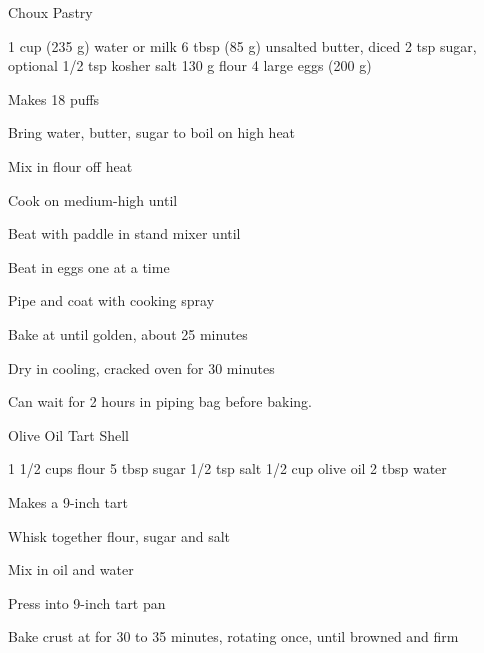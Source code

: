 
\begin{denserecipe}{Choux Pastry}{}
\begin{ingredients}
1 cup (235 g) water or milk
6 tbsp (85 g) unsalted butter, diced
2 tsp sugar, optional
1/2 tsp kosher salt
130 g flour
4 large eggs (200 g)
\end{ingredients}
\nextcolumn
Makes 18 puffs
\begin{steps}
    \item Bring water, butter, sugar to boil on high heat
    \item Mix in flour off heat
    \item Cook on medium-high until 
    \item Beat with paddle in stand mixer until 
    \item Beat in eggs one at a time
    \item Pipe and coat with cooking spray
    \item Bake at  until golden, about 25 minutes
    \item Dry in cooling, cracked oven for 30 minutes
\end{steps}
Can wait for 2 hours in piping bag before baking.
\end{denserecipe}

\begin{recipe}{Olive Oil Tart Shell}{}
\begin{ingredients}
1 1/2 cups flour
5 tbsp sugar
1/2 tsp salt
1/2 cup olive oil
2 tbsp water
\end{ingredients}
\nextcolumn
Makes a 9-inch tart
\begin{steps}
    \item Whisk together flour, sugar and salt
    \item Mix in oil and water
    \item Press into 9-inch tart pan
    \item Bake crust at  for 30 to 35 minutes, rotating once, until browned and firm
\end{steps}
\end{recipe}

